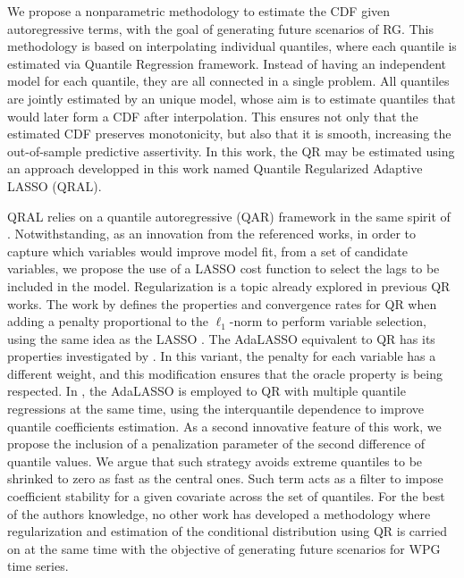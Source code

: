 We propose a nonparametric methodology to estimate the CDF given autoregressive terms, with the goal of generating future scenarios of RG. This methodology is based on interpolating individual quantiles, where each quantile is estimated via Quantile Regression framework.
Instead of having an independent model for each quantile, they are all connected in a single problem. All quantiles are jointly estimated by an unique model, whose aim is to estimate quantiles that would later form a CDF after interpolation. This ensures not only that the estimated CDF preserves monotonicity, but also that it is smooth, increasing the out-of-sample predictive assertivity.
In this work, the QR may be estimated using an approach developped in this work named Quantile Regularized Adaptive LASSO (QRAL).


QRAL relies on a quantile autoregressive (QAR) framework in the same spirit of \cite{koenker1978regression,koenker_quantile_2006,koenker2005quantile}. Notwithstanding, as an innovation from the referenced works, in order to capture which variables would improve model fit, from a set of candidate variables, we propose the use of a LASSO cost function to select the lags to be included in the model.
Regularization is a topic already explored in previous QR works.
The work by \cite{belloni_l1-penalized_2009} defines the properties and convergence rates for QR when adding a penalty proportional to the $\ell_1$-norm to perform variable selection, using the same idea as the LASSO \cite{tibshirani1996regression}. The AdaLASSO equivalent to QR has its properties investigated by \cite{ciuperca_adaptive_2016}. In this variant, the penalty for each variable has a different weight, and this modification ensures that the oracle property is being respected. %
In \cite{zou_regularized_2008,jiang_interquantile_2014}, the AdaLASSO is employed to QR with multiple quantile regressions at the same time, using the interquantile dependence to improve  quantile coefficients estimation.
As a second innovative feature of this work, we propose the inclusion of a penalization parameter of the second difference of quantile values. We argue that such strategy avoids extreme quantiles to be shrinked to zero as fast as the central ones. Such term acts as a filter to impose coefficient stability for a given covariate across the set of quantiles.
For the best of the authors knowledge, no other work has developed a methodology where regularization and estimation of the conditional distribution using QR is carried on at the same time with the objective of generating future scenarios for WPG time series.






